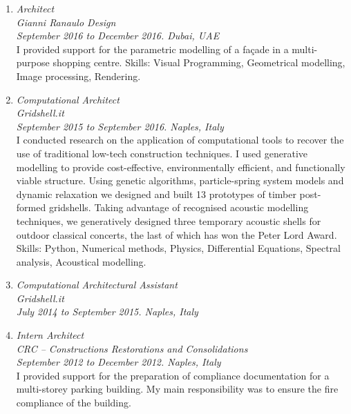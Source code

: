 \begin{enumerate}[leftmargin=0.45cm, itemsep=1em, topsep=0.5em, parsep=0.2em]
        \item
        \emph{Architect} \\
        \emph{Gianni Ranaulo Design} \\
        \textit{September 2016 to December 2016. Dubai, UAE} \vspace{0.2em} \\
        {I provided support for the parametric modelling of a façade in a multi-purpose shopping centre.}
        Skills: Visual Programming, Geometrical modelling, Image processing, Rendering.

        \item
        \emph{Computational Architect} \\
        \emph{Gridshell.it} \\
        \textit{September 2015 to September 2016. Naples, Italy} \vspace{0.2em} \\
        I conducted research on the application of computational tools to recover the use of traditional low-tech construction techniques. I used generative modelling to provide cost-effective, environmentally efficient, and functionally viable structure. Using genetic algorithms, particle-spring system models and dynamic relaxation we designed and built 13 prototypes of timber post-formed gridshells. Taking advantage of recognised acoustic modelling techniques, we generatively designed three temporary acoustic shells for outdoor classical concerts, the last of which has won the Peter Lord Award.
        Skills: Python, Numerical methods, Physics, Differential Equations, Spectral analysis, Acoustical modelling.

        \item \emph{Computational Architectural Assistant} \\
        \emph{Gridshell.it} \\
        \textit{July 2014 to September 2015. Naples, Italy}

        \item \emph{Intern Architect} \\
        \emph{CRC – Constructions Restorations and Consolidations} \\
        \textit{September 2012 to December 2012. Naples, Italy} \vspace{0.2em} \\
        {I provided support for the preparation of compliance documentation for a multi-storey parking building. My main responsibility was to ensure the fire compliance of the building.}
    \end{enumerate}